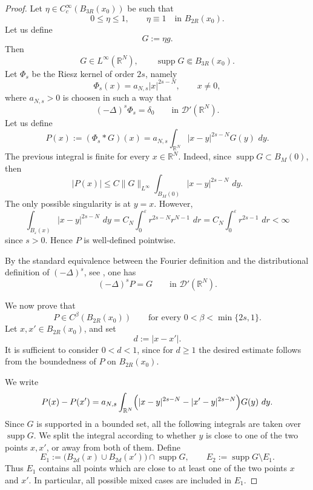 \documentclass[11pt,a4paper]{article}
\newcommand{\dd}{\,d}
\newcommand{\supp}{\operatorname{supp}}
\begin{document}
\begin{proof}
Let \(\eta\in C_c^\infty(B_{3R}(x_0))\) be such that
\[
0\le \eta\le 1,
\qquad
\eta\equiv1\quad\text{in }B_{2R}(x_0).
\]
Let us define
\[
G:=\eta g.
\]
Then
\[
G\in L^\infty(\mathbb R^N),
\qquad
\supp G\Subset B_{3R}(x_0).
\]
Let \(\Phi_s\) be the Riesz kernel of order \(2s\), namely
\[
\Phi_s(x)=a_{N,s}|x|^{2s-N},
\qquad x\neq0,
\]
where \(a_{N,s}>0\) is choosen in such a way that 
\[
(-\Delta)^s\Phi_s=\delta_0
\qquad\text{in }\mathcal D'(\mathbb R^N).
\]
Let us define
\[
P(x):=(\Phi_s*G)(x)
=
a_{N,s}\int_{\mathbb R^N}|x-y|^{2s-N}G(y)\,\dd y.
\]
The previous integral is finite for every \(x\in\mathbb R^N\). Indeed,
since \(\supp G\subset B_M(0)\), then
\[
|P(x)|
\le
C\|G\|_{L^\infty}
\int_{B_M(0)} |x-y|^{2s-N}\,\dd y.
\]
The only possible singularity is at \(y=x\). However,
\[
\int_{B_\varepsilon(x)} |x-y|^{2s-N}\,\dd y
=
C_N\int_0^\varepsilon r^{2s-N}r^{N-1}\,\dd r
=
C_N\int_0^\varepsilon r^{2s-1}\,\dd r
<\infty
\]
since \(s>0\).
Hence \(P\) is well-defined pointwise.



By the standard equivalence between the Fourier definition 
and the distributional definition of \((-\Delta)^{s}\), see
\cite[Theorem 1.1]{Kwasnicki}, one has
\[
(-\Delta)^s P=G
\qquad\text{in }\mathcal D'(\mathbb R^N).
\]

We now prove that
\[
P\in C^\beta(B_{2R}(x_0))
\qquad
\text{for every }0<\beta<\min\{2s,1\}.
\]
Let \(x,x'\in B_{2R}(x_0)\), and set
\[
d:=|x-x'|.
\]
It is sufficient to consider \(0<d<1\), since for \(d\ge1\) the desired estimate
follows from the boundedness of \(P\) on \(B_{2R}(x_0)\).

We write
\[
P(x)-P(x')
=
a_{N,s}\int_{\mathbb R^N}
\Bigl(|x-y|^{2s-N}-|x'-y|^{2s-N}\Bigr)G(y)\,\dd y.
\]
Since \(G\) is supported in a bounded set, all the following integrals
are taken over \(\supp G\). We split the integral according to whether \(y\) is close to one of the two
points \(x,x'\), or away from both of them. Define
\[
E_1:=
\bigl(B_{2d}(x)\cup B_{2d}(x')\bigr)\cap\supp G,
\qquad
E_2:=\supp G\setminus E_1.
\]
Thus \(E_1\) contains all points which are close to at least one of the two
points \(x\) and \(x'\). In particular, all possible mixed cases are included
in \(E_1\).


\end{proof}
\end{document}
